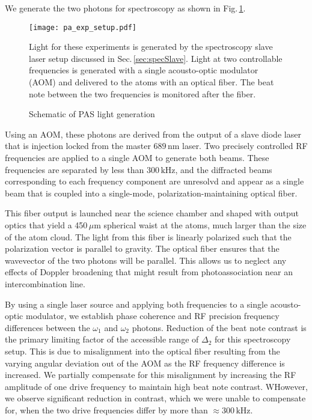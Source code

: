 We generate the two photons for spectroscopy as shown in Fig.\,\ref{fig:pas_light_gen}.
	\begin{figure} 
		\centerline{
		\texttt{[image: pa\_exp\_setup.pdf]}}
		\caption{Schematic of PAS light generation}{Light for these experiments is generated by the spectroscopy slave laser setup discussed in Sec.\,\ref{sec:specSlave}. Light at two controllable frequencies is generated with a single acousto-optic modulator (AOM) and delivered to the atoms with an optical fiber. The beat note between the two frequencies is monitored after the fiber.}
		\label{fig:pas_light_gen}
	\end{figure} 
Using an AOM, these photons are derived from the output of a slave diode laser that is injection locked from the master $689\,\text{nm}$ laser.
Two precisely controlled RF frequencies are applied to a single AOM to generate both beams.
These frequencies are separated by less than $300\,\text{kHz}$, and the diffracted beams corresponding to each frequency component are unresolvd and appear as a single beam that is coupled into a single-mode, polarization-maintaining optical fiber.

This fiber output is launched near the science chamber and shaped with output optics that yield a 450\,$\mu$m spherical waist at the atoms, much larger than the size of the atom cloud.
The light from this fiber is linearly polarized such that the polarization vector is parallel to gravity.
The optical fiber ensures that the wavevector of the two photons will be parallel.
This allows us to neglect any effects of Doppler broadening that might result from photoassociation near an intercombination line.

By using a single laser source and applying both frequencies to a single acousto-optic modulator, we establish phase coherence and RF precision frequency differences between the $\omega_1$ and $\omega_2$ photons.
Reduction of the beat note contrast is the primary limiting factor of the accessible range of $\Delta_2$ for this spectroscopy setup.
This is due to misalignment into the optical fiber resulting from the varying angular deviation out of the AOM as the RF frequency difference is increased.
We partially compensate for this misalignment by increasing the RF amplitude of one drive frequency to maintain high beat note contrast.
WHowever, we observe significant reduction in contrast, which we were unable to compensate for, when the two drive frequencies differ by more than $\approx\!300\,\text{kHz}$. 


